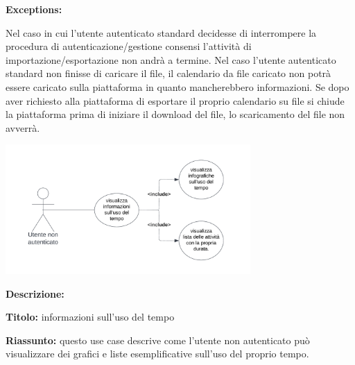 \begin{listaPersonale}[UC]{}
    \textbf{Exceptions:}
    \begin{enumerate}[label=\textbf{[exception \arabic{enumii}]}, ref= \textbf{[exception \arabic{enumii}]}]
         Nel caso in cui l'utente autenticato standard decidesse di interrompere la procedura di autenticazione/gestione consensi l'attività di importazione/esportazione non andrà a termine.
         Nel caso l'utente autenticato standard non finisse di caricare il file, il calendario da file caricato non potrà essere caricato sulla piattaforma in quanto mancherebbero informazioni.
         Se dopo aver richiesto alla piattaforma di esportare il proprio calendario su file si chiude la piattaforma prima di iniziare il download del file, lo scaricamento del file non avverrà.
    \end{enumerate}




    \newpage


    \begin{center}
        \includegraphics[width=0.7\textwidth]{img/Diagrammi/UseCases/UsoDelTempo.png}
    \end{center}

    \textbf{Descrizione:}

    \textbf{Titolo:} informazioni sull'uso del tempo

    \textbf{Riassunto:} questo use case descrive come l'utente non autenticato può visualizzare dei grafici e liste esemplificative sull'uso del proprio tempo.


\end{listaPersonale}
